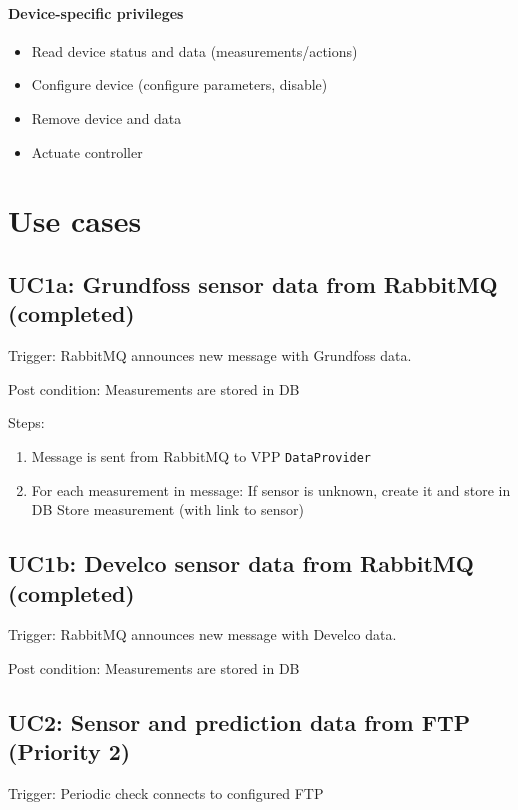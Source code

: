 \paragraph{Device-specific privileges}
\begin{itemize}
    \item{Read device status and data (measurements/actions)}
    \item{Configure device (configure parameters, disable)}
    \item{Remove device and data}
    \item{Actuate controller}
\end{itemize}

\newpage
\section{Use cases}

\subsection*{UC1a: Grundfoss sensor data from RabbitMQ (completed)}\label{uc1}
\noindent Trigger: RabbitMQ announces new message with Grundfoss data.

\noindent Post condition: Measurements are stored in DB

\noindent Steps: 
\begin{enumerate}
    \item Message is sent from RabbitMQ to VPP \texttt{DataProvider}
    \item For each measurement in message:
        \subitem If sensor is unknown, create it and store in DB
        \subitem Store measurement (with link to sensor)
\end{enumerate}

\subsection*{UC1b: Develco sensor data from RabbitMQ (completed)}\label{uc1}
\noindent Trigger: RabbitMQ announces new message with Develco data.

\noindent Post condition: Measurements are stored in DB

\subsection*{UC2: Sensor and prediction data from FTP (Priority 2)}
\noindent Trigger: Periodic check connects to configured FTP

